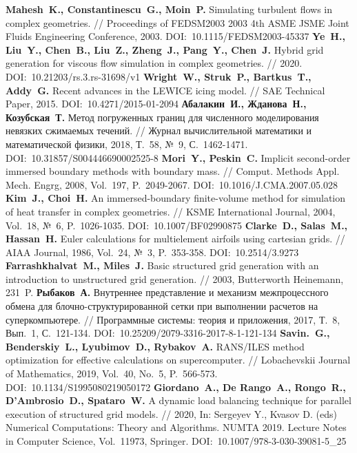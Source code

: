 \begin{thebibliography}{99}
%
\textbf{Mahesh~K., Constantinescu~G., Moin~P.} Simulating turbulent flows in complex geometries. // Proceedings of FEDSM2003 2003 4th ASME JSME Joint Fluids Engineering Conference, 2003. DOI:~10.1115/FEDSM2003-45337
%
\textbf{Ye~H., Liu~Y., Chen~B., Liu~Z., Zheng~J., Pang~Y., Chen~J.} Hybrid grid generation for viscous flow simulation in complex geometries. // 2020. DOI:~10.21203/rs.3.rs-31698/v1
%
\textbf{Wright~W., Struk~P., Bartkus~T., Addy~G.} Recent advances in the LEWICE icing model. // SAE Technical Paper, 2015. DOI:~10.4271/2015-01-2094
%
\textbf{Абалакин~И., Жданова~Н., Козубская~Т.} Метод погруженных границ для численного моделирования невязких сжимаемых течений. // Журнал вычислительной математики и математической физики, 2018, Т.~58, №~9, С.~1462-1471. DOI:~10.31857/S004446690002525-8
%
\textbf{Mori~Y., Peskin~C.} Implicit second-order immersed boundary methods with boundary mass. // Comput. Methods Appl. Mech. Engrg, 2008, Vol.~197, P.~2049-2067. DOI:~10.1016/J.CMA.2007.05.028
%
\textbf{Kim~J., Choi~H.} An immersed-boundary finite-volume method for simulation of heat transfer in complex geometries. // KSME International Journal, 2004, Vol.~18, №~6, P.~1026-1035. DOI:~10.1007/BF02990875
%
\textbf{Clarke~D., Salas~M., Hassan~H.} Euler calculations for multielement airfoils using cartesian grids. // AIAA Journal, 1986, Vol.~24, №~3, P.~353-358. DOI:~10.2514/3.9273
%
\textbf{Farrashkhalvat~M., Miles~J.} Basic structured grid generation with an introduction to unstructured grid generation. // 2003, Butterworth Heinemann, 231~P.
%
\textbf{Рыбаков~А.} Внутреннее представление и механизм межпроцессного обмена для блочно-структурированной сетки при выполнении расчетов на суперкомпьютере. // Программные системы: теория и приложения, 2017, Т.~8, Вып.~1, С.~121-134. DOI:~10.25209/2079-3316-2017-8-1-121-134
%
\textbf{Savin.~G., Benderskiy~L., Lyubimov~D., Rybakov~A.} RANS/ILES method optimization for effective calculations on supercomputer. // Lobachevskii Journal of Mathematics, 2019, Vol.~40, No.~5, P.~566-573. DOI:~10.1134/S1995080219050172
%
\textbf{Giordano~A., De Rango~A., Rongo~R., D'Ambrosio~D., Spataro~W.} A dynamic load balancing technique for parallel execution of structured grid models. // 2020, In: Sergeyev Y., Kvasov D. (eds) Numerical Computations: Theory and Algorithms. NUMTA 2019. Lecture Notes in Computer Science, Vol.~11973, Springer. DOI:~10.1007/978-3-030-39081-5\_25

\end{thebibliography}
